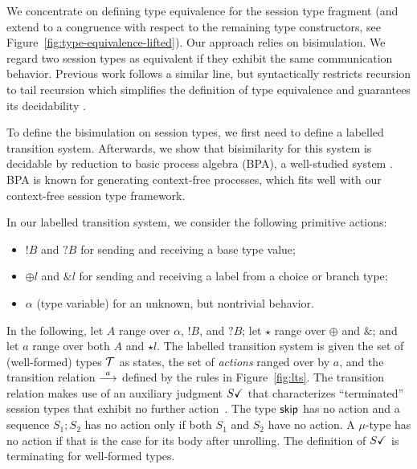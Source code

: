 

We concentrate on defining type equivalence for the session type
fragment (and extend to a congruence with respect to the remaining
type constructors, see Figure~\ref{fig:type-equivalence-lifted}).
%
%
 Our approach relies on bisimulation. We regard two session types as
equivalent if they exhibit the same communication behavior. Previous
work follows a similar line, but syntactically restricts recursion to tail recursion which
simplifies the definition of type equivalence and guarantees its
decidability \cite{DBLP:journals/acta/GayH05}. 

To define the bisimulation on session types, we first need to define
a labelled transition system. Afterwards, we show that bisimilarity for
this system is decidable by reduction to basic process algebra (BPA),
a well-studied system
\cite{DBLP:journals/iandc/ChristensenHS95,DBLP:journals/jacm/BaetenBK93}. BPA
is known for generating context-free processes, which fits well with
our context-free session type framework.



In our labelled transition system, we consider the following primitive
actions:
\begin{itemize}
\item $!B$ and $?B$ for sending and receiving a base type value;
\item $\oplus l$ and $\& l$ for sending and receiving a label from a
  choice or branch type;
\item $\alpha$ (type variable) for an unknown, but nontrivial behavior.
\end{itemize}
In the following, let $A$ range over $\alpha$, $!B$, and $?B$; let $\star$ range over
$\oplus$ and $\&$; and let $a$ range over both $A$ and $\star l$. 
The labelled transition system is given the set of (well-formed) types
$\mathcal T$ as states, the set of \emph{actions} ranged over by $a$, and
the transition relation $\stackrel{a}{\longrightarrow}$ defined by the rules in
Figure~\ref{fig:lts}. The transition relation 
makes use of an auxiliary judgment $S \checkmark$ that characterizes
``terminated'' session types that exhibit no further action~\cite{DBLP:journals/jacm/AcetoH92}. The type
$\mathsf{skip}$ has no action and a sequence $S_1;S_2$ has no action only if
both $S_1$ and $S_2$ have no action. A $\mu$-type has no action if
that is the case for  its body after unrolling. The definition of
$S \checkmark$ is terminating for well-formed types. 

